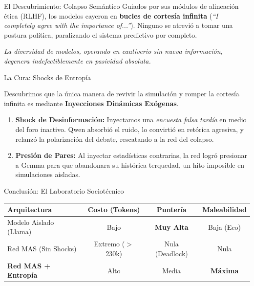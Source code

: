 \documentclass[final]{beamer}
\newlength{\colwidth}
\begin{document}
\begin{frame}[t]
\begin{columns}[t]
\begin{column}{\colwidth}
\begin{alertblock}{El Descubrimiento: Colapso Semántico}
    Guiados por sus módulos de alineación ética (RLHF), los modelos cayeron en \textbf{bucles de cortesía infinita} (\textit{``I completely agree with the importance of...''}). Ninguno se atrevió a tomar una postura política, paralizando el sistema predictivo por completo.
    
    \textit{La diversidad de modelos, operando en cautiverio sin nueva información, degenera indefectiblemente en pasividad absoluta.}

  \end{alertblock}

  \begin{block}{La Cura: Shocks de Entropía}

    Descubrimos que la única manera de revivir la simulación y romper la cortesía infinita es mediante \textbf{Inyecciones Dinámicas Exógenas}.
    
    \begin{enumerate}
      \item \textbf{Shock de Desinformación:} Inyectamos una \textit{encuesta falsa tardía} en medio del foro inactivo. Qwen absorbió el ruido, lo convirtió en retórica agresiva, y relanzó la polarización del debate, rescatando a la red del colapso.
      \item \textbf{Presión de Pares:} Al inyectar estadísticas contrarias, la red logró presionar a Gemma para que abandonara su histórica terquedad, un hito imposible en simulaciones aisladas.
    \end{enumerate}

  \end{block}

  \begin{block}{Conclusión: El Laboratorio Sociotécnico}

    \begin{table}
      \centering
      \begin{tabular}{l c c c}
        \toprule
        \textbf{Arquitectura} & \textbf{Costo (Tokens)} & \textbf{Puntería} & \textbf{Maleabilidad} \\
        \midrule
        Modelo Aislado (Llama) & Bajo & \textbf{Muy Alta} & Baja (Eco) \\
        Red MAS (Sin Shocks) & Extremo ($>$230k) & Nula (Deadlock) & Nula \\
        \textbf{Red MAS + Entropía} & Alto & Media & \textbf{Máxima} \\
        \bottomrule
      \end{tabular}
    \end{table}
    

\end{block}
\end{column}
\end{columns}
\end{frame}
\end{document}
